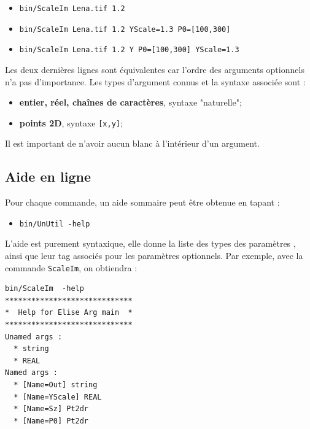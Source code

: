 \begin{itemize}
    \item {\tt bin/ScaleIm Lena.tif 1.2}
    \item {\tt bin/ScaleIm Lena.tif 1.2 YScale=1.3 P0=[100,300]}
    \item {\tt bin/ScaleIm Lena.tif 1.2 Y P0=[100,300] YScale=1.3}
\end{itemize}

Les deux derni\`eres lignes sont \'equivalentes car l'ordre des
arguments optionnels n'a pas d'importance. Les types d'argument
connus et la syntaxe associ\'ee sont :


\begin{itemize}
    \item {\bf entier, r\'eel, cha\^ines de caract\`eres}, syntaxe "naturelle";
    \item {\bf  points 2D}, syntaxe {\tt [x,y]};
\end{itemize}

Il est important de n'avoir aucun blanc \`a l'int\'erieur d'un argument.

\subsection{Aide en ligne}

Pour chaque commande, un aide sommaire peut \^etre obtenue en 
tapant :

\begin{itemize}
    \item {\tt bin/UnUtil -help}
\end{itemize}

L'aide est purement syntaxique, elle donne la liste des types
des  param\`etres , ainsi que leur tag associ\'es pour les param\`etres
optionnels. Par exemple, avec la commande {\tt ScaleIm}, on
obtiendra :

\begin{verbatim}
bin/ScaleIm  -help
*****************************
*  Help for Elise Arg main  *
*****************************
Unamed args :
  * string
  * REAL
Named args :
  * [Name=Out] string
  * [Name=YScale] REAL
  * [Name=Sz] Pt2dr
  * [Name=P0] Pt2dr
\end{verbatim}
\label{UTILBIN:HELP}



